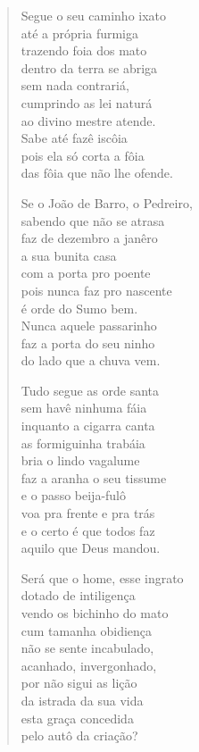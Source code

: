 \begin{verse}
Segue o seu caminho ixato\\
até a própria furmiga\\
trazendo foia dos mato\\
dentro da terra se abriga\\
sem nada contrariá,\\
cumprindo as lei naturá\\
ao divino mestre atende.\\
Sabe até fazê iscôia\\
pois ela só corta a fôia\\
das fôia que não lhe ofende.

Se o João de Barro, o Pedreiro,\\
sabendo que não se atrasa\\
faz de dezembro a janêro\\
a sua bunita casa\\
com a porta pro poente\\
pois nunca faz pro nascente\\
é orde do Sumo bem.\\
Nunca aquele passarinho\\
faz a porta do seu ninho\\
do lado que a chuva vem.

Tudo segue as orde santa\\
sem havê ninhuma fáia\\
inquanto a cigarra canta\\
as formiguinha trabáia\\
bria o lindo vagalume\\
faz a aranha o seu tissume\\
e o passo beija-fulô\\
voa pra frente e pra trás\\
e o certo é que todos faz\\
aquilo que Deus mandou.

Será que o home, esse ingrato\\
dotado de intiligença\\
vendo os bichinho do mato\\
cum tamanha obidiença\\
não se sente incabulado,\\
acanhado, invergonhado,\\
por não sigui as lição\\
da istrada da sua vida\\
esta graça concedida\\
pelo autô da criação?


\end{verse}
